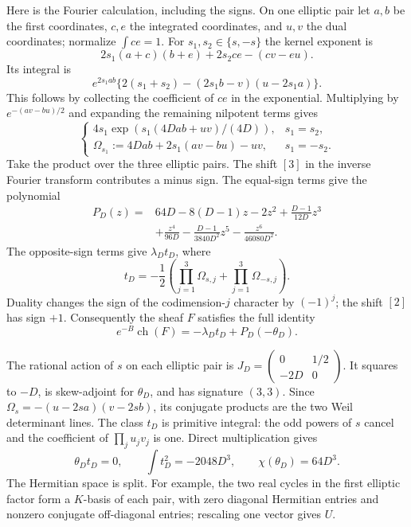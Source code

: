 Here is the Fourier calculation, including the signs. On one elliptic pair let $a,b$ be the first coordinates, $c,e$ the integrated coordinates, and $u,v$ the dual coordinates; normalize $\int ce=1$. For $s_1,s_2\in\{s,-s\}$ the kernel exponent is
\[
 2s_1(a+c)(b+e)+2s_2ce-(cv-eu).
\]
Its integral is
\[
 e^{2s_1ab}\{2(s_1+s_2)-(2s_1b-v)(u-2s_1a)\}.
\]
This follows by collecting the coefficient of $ce$ in the exponential. Multiplying by $e^{-(av-bu)/2}$ and expanding the remaining nilpotent terms gives
\[
 \begin{cases}
 4s_1\exp(s_1(4Dab+uv)/(4D)),&s_1=s_2,\\
 \Omega_{s_1}:=4Dab+2s_1(av-bu)-uv,&s_1=-s_2.
 \end{cases}
\]
Take the product over the three elliptic pairs. The shift $[3]$ in the inverse Fourier transform contributes a minus sign. The equal-sign terms give the polynomial
\begin{equation}\label{eq:effective-polynomial}
 \begin{split}
 P_D(z)={}&64D-8(D-1)z-2z^2+\frac{D-1}{12D}z^3\\
 &+\frac{z^4}{96D}-\frac{D-1}{3840D^2}z^5
       -\frac{z^6}{46080D^2}.
 \end{split}
\end{equation}
The opposite-sign terms give $\lambda_Dt_D$, where
\[
 t_D=-\frac12\left(\prod_{j=1}^3\Omega_{s,j}
                      +\prod_{j=1}^3\Omega_{-s,j}\right).
\]
Duality changes the sign of the codimension-$j$ character by $(-1)^j$; the shift $[2]$ has sign $+1$. Consequently the sheaf $F$ satisfies the full identity
\begin{equation}\label{eq:effective-character}
 e^{-B}\operatorname{ch}(F)=-\lambda_Dt_D+P_D(-\theta_D).
\end{equation}

The rational action of $s$ on each elliptic pair is
$J_D=\left(\begin{smallmatrix}0&1/2\\-2D&0\end{smallmatrix}\right)$.
It squares to $-D$, is skew-adjoint for $\theta_D$, and has signature $(3,3)$. Since
$\Omega_s=-(u-2sa)(v-2sb)$, its conjugate products are the two Weil determinant lines. The class $t_D$ is primitive integral: the odd powers of $s$ cancel and the coefficient of $\prod_j u_jv_j$ is one. Direct multiplication gives
\[
 \theta_Dt_D=0,\qquad \int t_D^2=-2048D^3,
 \qquad \chi(\theta_D)=64D^3.
\]
The Hermitian space is split. For example, the two real cycles in the first elliptic factor form a $K$-basis of each pair, with zero diagonal Hermitian entries and nonzero conjugate off-diagonal entries; rescaling one vector gives $U$.

